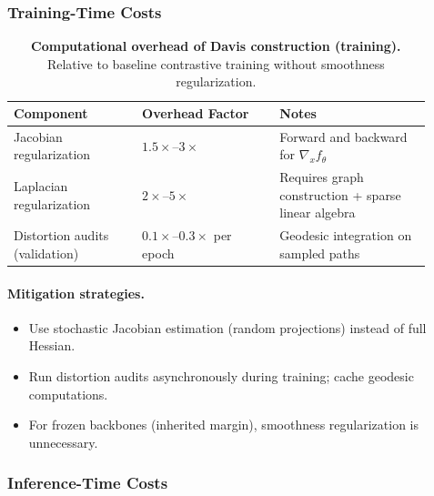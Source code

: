 \documentclass[11pt]{article}
\begin{document}
\subsubsection{Training-Time Costs}

\begin{table}[H]
\centering
\caption{\textbf{Computational overhead of Davis construction (training).} Relative to baseline contrastive training without smoothness regularization.}
\label{tab:training-costs}
\begin{tabularx}{\linewidth}{@{}p{0.28\linewidth}p{0.30\linewidth}p{0.33\linewidth}@{}}
\toprule
\textbf{Component} & \textbf{Overhead Factor} & \textbf{Notes} \\
\midrule
Jacobian regularization & $1.5\times$--$3\times$ & Forward and backward for $\nabla_x f_\theta$ \\
Laplacian regularization & $2\times$--$5\times$ & Requires graph construction + sparse linear algebra \\
Distortion audits (validation) & $0.1\times$--$0.3\times$ per epoch & Geodesic integration on sampled paths \\
\bottomrule
\end{tabularx}
\end{table}

\paragraph{Mitigation strategies.}
\begin{itemize}[leftmargin=*]
  \item Use stochastic Jacobian estimation (random projections) instead of full Hessian.
  \item Run distortion audits asynchronously during training; cache geodesic computations.
  \item For frozen backbones (inherited margin), smoothness regularization is unnecessary.
\end{itemize}

\subsubsection{Inference-Time Costs}
\end{document}
